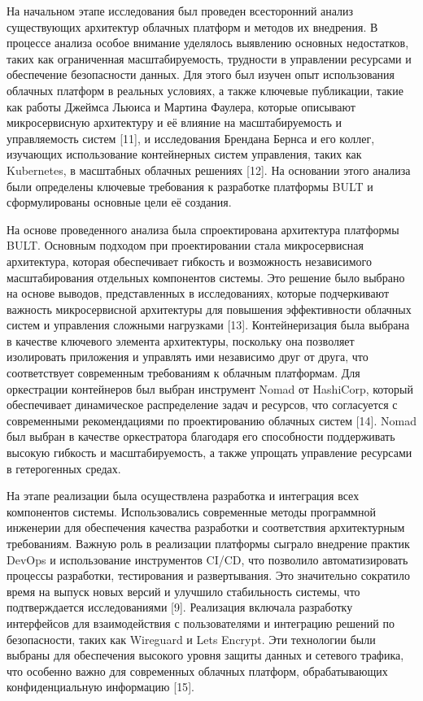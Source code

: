 \documentclass[
]{article}
\begin{document}
На начальном этапе исследования был проведен всесторонний анализ
существующих архитектур облачных платформ и методов их внедрения. В
процессе анализа особое внимание уделялось выявлению основных
недостатков, таких как ограниченная масштабируемость, трудности в
управлении ресурсами и обеспечение безопасности данных. Для этого был
изучен опыт использования облачных платформ в реальных условиях, а также
ключевые публикации, такие как работы Джеймса Льюиса и Мартина Фаулера,
которые описывают микросервисную архитектуру и её влияние на
масштабируемость и управляемость систем {[}11{]}, и исследования
Брендана Бернса и его коллег, изучающих использование контейнерных
систем управления, таких как Kubernetes, в масштабных облачных решениях
{[}12{]}. На основании этого анализа были определены ключевые требования
к разработке платформы BULT и сформулированы основные цели её создания.

На основе проведенного анализа была спроектирована архитектура платформы
BULT. Основным подходом при проектировании стала микросервисная
архитектура, которая обеспечивает гибкость и возможность независимого
масштабирования отдельных компонентов системы. Это решение было выбрано
на основе выводов, представленных в исследованиях, которые подчеркивают
важность микросервисной архитектуры для повышения эффективности облачных
систем и управления сложными нагрузками {[}13{]}. Контейнеризация была
выбрана в качестве ключевого элемента архитектуры, поскольку она
позволяет изолировать приложения и управлять ими независимо друг от
друга, что соответствует современным требованиям к облачным платформам.
Для оркестрации контейнеров был выбран инструмент Nomad от HashiCorp,
который обеспечивает динамическое распределение задач и ресурсов, что
согласуется с современными рекомендациями по проектированию облачных
систем {[}14{]}. Nomad был выбран в качестве оркестратора благодаря его
способности поддерживать высокую гибкость и масштабируемость, а также
упрощать управление ресурсами в гетерогенных средах.

На этапе реализации была осуществлена разработка и интеграция всех
компонентов системы. Использовались современные методы программной
инженерии для обеспечения качества разработки и соответствия
архитектурным требованиям. Важную роль в реализации платформы сыграло
внедрение практик DevOps и использование инструментов CI/CD, что
позволило автоматизировать процессы разработки, тестирования и
развертывания. Это значительно сократило время на выпуск новых версий и
улучшило стабильность системы, что подтверждается исследованиями
{[}9{]}. Реализация включала разработку интерфейсов для взаимодействия с
пользователями и интеграцию решений по безопасности, таких как Wireguard
и Let\textquotesingle s Encrypt. Эти технологии были выбраны для
обеспечения высокого уровня защиты данных и сетевого трафика, что
особенно важно для современных облачных платформ, обрабатывающих
конфиденциальную информацию {[}15{]}.
\end{document}
